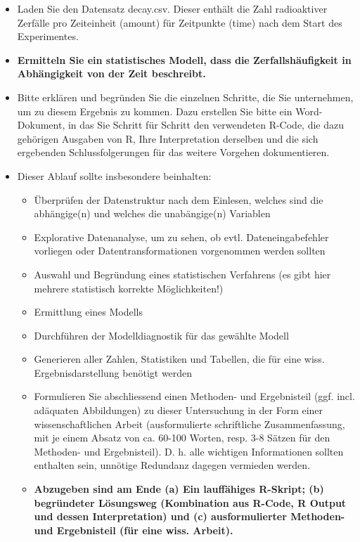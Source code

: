 \documentclass[
]{article}
\providecommand{\tightlist}{%
  \setlength{\itemsep}{0pt}\setlength{\parskip}{0pt}}
\begin{document}
\begin{itemize}
\tightlist
\item
  Laden Sie den Datensatz decay.csv. Dieser enthält die Zahl
  radioaktiver Zerfälle pro Zeiteinheit (amount) für Zeitpunkte (time)
  nach dem Start des Experimentes.
\item
  \textbf{Ermitteln Sie ein statistisches Modell, dass die
  Zerfallshäufigkeit in Abhängigkeit von der Zeit beschreibt.}
\item
  Bitte erklären und begründen Sie die einzelnen Schritte, die Sie
  unternehmen, um zu diesem Ergebnis zu kommen. Dazu erstellen Sie bitte
  ein Word-Dokument, in das Sie Schritt für Schritt den verwendeten
  R-Code, die dazu gehörigen Ausgaben von R, Ihre Interpretation
  derselben und die sich ergebenden Schlussfolgerungen für das weitere
  Vorgehen dokumentieren.
\item
  Dieser Ablauf sollte insbesondere beinhalten:

  \begin{itemize}
  \tightlist
  \item
    Überprüfen der Datenstruktur nach dem Einlesen, welches sind die
    abhängige(n) und welches die unabängige(n) Variablen
  \item
    Explorative Datenanalyse, um zu sehen, ob evtl. Dateneingabefehler
    vorliegen oder Datentransformationen vorgenommen werden sollten
  \item
    Auswahl und Begründung eines statistischen Verfahrens (es gibt hier
    mehrere statistisch korrekte Möglichkeiten!)
  \item
    Ermittlung eines Modells
  \item
    Durchführen der Modelldiagnostik für das gewählte Modell
  \item
    Generieren aller Zahlen, Statistiken und Tabellen, die für eine
    wiss. Ergebnisdarstellung benötigt werden
  \item
    Formulieren Sie abschliessend einen Methoden- und Ergebnisteil (ggf.
    incl. adäquaten Abbildungen) zu dieser Untersuchung in der Form
    einer wissenschaftlichen Arbeit (ausformulierte schriftliche
    Zusammenfassung, mit je einem Absatz von ca. 60-100 Worten, resp.
    3-8 Sätzen für den Methoden- und Ergebnisteil). D. h. alle wichtigen
    Informationen sollten enthalten sein, unnötige Redundanz dagegen
    vermieden werden.
  \item
    \textbf{Abzugeben sind am Ende (a) Ein lauffähiges R-Skript; (b)
    begründeter Lösungsweg (Kombination aus R-Code, R Output und dessen
    Interpretation) und (c) ausformulierter Methoden- und Ergebnisteil
    (für eine wiss. Arbeit).}
  \end{itemize}
\end{itemize}
\end{document}
